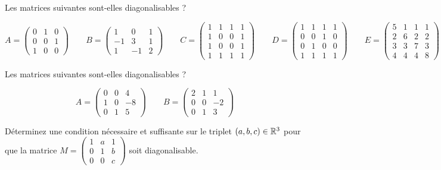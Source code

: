 \begin{exos}[Exercice 10]
Les matrices suivantes sont-elles diagonalisables ?

\[A=\begin{pmatrix}
0 & 1 & 0 \\
0 & 0 & 1 \\
1 & 0 & 0
\end{pmatrix}\qquad B=\begin{pmatrix}
1 & 0 & 1 \\
-1 & 3 & 1 \\
1 & -1 & 2
\end{pmatrix}\qquad C=\begin{pmatrix}
1 & 1 & 1 & 1 \\
1 & 0 & 0 & 1 \\
1 & 0 & 0 & 1 \\
1 & 1 & 1 & 1
\end{pmatrix}\qquad D=\begin{pmatrix}
1 & 1 & 1 & 1 \\
0 & 0 & 1 & 0 \\
0 & 1 & 0 & 0 \\
1 & 1 & 1 & 1
\end{pmatrix}\qquad E=\begin{pmatrix}
5 & 1 & 1 & 1 \\
2 & 6 & 2 & 2 \\
3 & 3 & 7 & 3 \\
4 & 4 & 4 & 8
\end{pmatrix}\]
\end{exos}



\begin{exos}[Exercice 11]
Les matrices suivantes sont-elles diagonalisables ?

\[A=\begin{pmatrix}
0 & 0 & 4 \\
1 & 0 & -8 \\
0 & 1 & 5
\end{pmatrix}\qquad B=\begin{pmatrix}
2 & 1 & 1 \\
0 & 0 & -2 \\
0 & 1 & 3
\end{pmatrix}\]
\end{exos}



\begin{exos}[Exercice 12]
Déterminez une condition nécessaire et suffisante sur le triplet \(\left(a,b,c\right)\in\mathbb{R}^3\) pour que la matrice \(M=\begin{pmatrix}
1 & a & 1 \\
0 & 1 & b \\
0 & 0 & c
\end{pmatrix}\) soit diagonalisable.
\end{exos}



